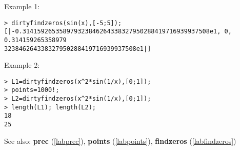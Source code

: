 \noindent Example 1: 
\begin{center}\begin{minipage}{15cm}\begin{Verbatim}[frame=single]
> dirtyfindzeros(sin(x),[-5;5]);
[|-0.314159265358979323846264338327950288419716939937508e1, 0, 0.314159265358979
323846264338327950288419716939937508e1|]
\end{Verbatim}
\end{minipage}\end{center}
\noindent Example 2: 
\begin{center}\begin{minipage}{15cm}\begin{Verbatim}[frame=single]
> L1=dirtyfindzeros(x^2*sin(1/x),[0;1]);
> points=1000!;
> L2=dirtyfindzeros(x^2*sin(1/x),[0;1]);
> length(L1); length(L2);
18
25
\end{Verbatim}
\end{minipage}\end{center}
See also: \textbf{prec} (\ref{labprec}), \textbf{points} (\ref{labpoints}), \textbf{findzeros} (\ref{labfindzeros})
